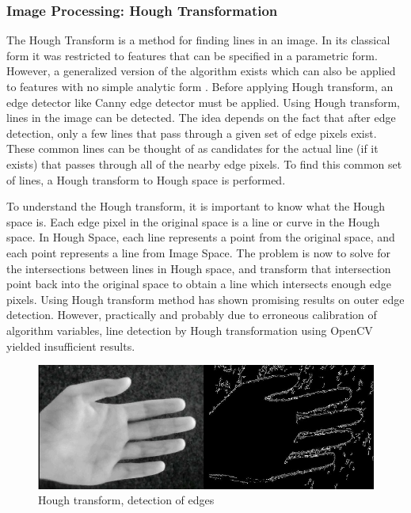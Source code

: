 \subsubsection{Image Processing: Hough Transformation}

The Hough Transform is a method for finding lines in an image. In its classical form it was restricted to features that can be specified in a parametric form. However, a generalized version of the algorithm exists which can also be applied to features with no simple analytic form \parencite{hough}. Before applying Hough transform, an edge detector like Canny edge detector must be applied. Using Hough transform, lines in the image can be detected. The idea depends on the fact that after edge detection, only a few lines that pass through a given set of edge pixels exist. These common lines can be thought of as candidates for the actual line (if it exists) that passes through all of the nearby edge pixels. To find this common set of lines, a Hough transform to Hough space is performed. 

To understand the Hough transform, it is important to know what the Hough space is. Each edge pixel in the original space is a line or curve in the Hough space. In Hough Space, each line represents a point from the original space, and each point represents a line from Image Space. The problem is now to solve for the intersections between lines in Hough space, and transform that intersection point back into the original space to obtain a line which intersects enough edge pixels. 
Using Hough transform method has shown promising results on outer edge detection. However, practically and probably due to erroneous calibration of algorithm variables, line detection by Hough transformation using OpenCV yielded insufficient results.


\begin{figure}[H]
\centering
\includegraphics[scale=0.7]{figures/compare6.JPG}
\caption[Hough transform, detection of edges]{Hough transform, detection of edges}\label{fig:Compare6}
\end{figure}


